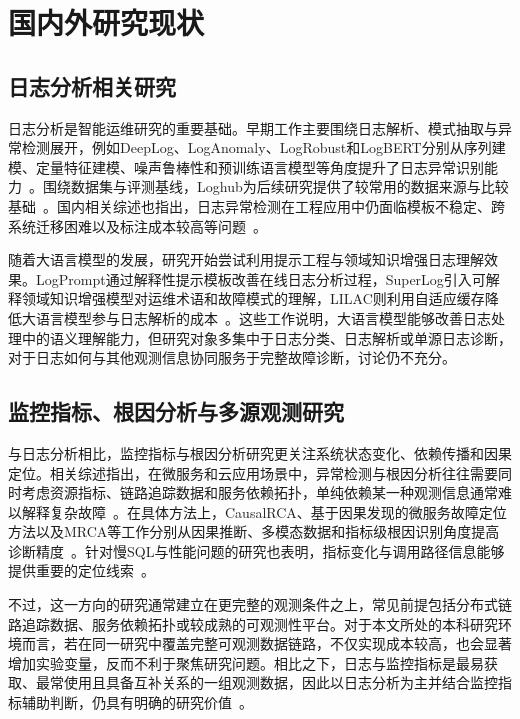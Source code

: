 \section{国内外研究现状}

\subsection{日志分析相关研究}

日志分析是智能运维研究的重要基础。早期工作主要围绕日志解析、模式抽取与异常检测展开，例如DeepLog、LogAnomaly、LogRobust和LogBERT分别从序列建模、定量特征建模、噪声鲁棒性和预训练语言模型等角度提升了日志异常识别能力~\cite{du2017deeplog,meng2019loganomaly,zhang2019logrobust,guo2021logbert}。围绕数据集与评测基线，Loghub为后续研究提供了较常用的数据来源与比较基础~\cite{he2020loghub,zhu2023loghub}。国内相关综述也指出，日志异常检测在工程应用中仍面临模板不稳定、跨系统迁移困难以及标注成本较高等问题~\cite{jia2020logsurvey,yan2022logsurveyml}。

随着大语言模型的发展，研究开始尝试利用提示工程与领域知识增强日志理解效果。LogPrompt通过解释性提示模板改善在线日志分析过程，SuperLog引入可解释领域知识增强模型对运维术语和故障模式的理解，LILAC则利用自适应缓存降低大语言模型参与日志解析的成本~\cite{liu2024logprompt,ji2025superlog,jiang2024lilac}。这些工作说明，大语言模型能够改善日志处理中的语义理解能力，但研究对象多集中于日志分类、日志解析或单源日志诊断，对于日志如何与其他观测信息协同服务于完整故障诊断，讨论仍不充分。

\subsection{监控指标、根因分析与多源观测研究}

与日志分析相比，监控指标与根因分析研究更关注系统状态变化、依赖传播和因果定位。相关综述指出，在微服务和云应用场景中，异常检测与根因分析往往需要同时考虑资源指标、链路追踪数据和服务依赖拓扑，单纯依赖某一种观测信息通常难以解释复杂故障~\cite{soldani2023survey,cheng2023rcasurvey,zhang2024fdsurvey}。在具体方法上，CausalRCA、基于因果发现的微服务故障定位方法以及MRCA等工作分别从因果推断、多模态数据和指标级根因识别角度提高诊断精度~\cite{xin2023causalrca,ikram2022causaldiscovery,wang2024mrca}。针对慢SQL与性能问题的研究也表明，指标变化与调用路径信息能够提供重要的定位线索~\cite{ma2020slowquery,pham2024rcacausal}。

不过，这一方向的研究通常建立在更完整的观测条件之上，常见前提包括分布式链路追踪数据、服务依赖拓扑或较成熟的可观测性平台。对于本文所处的本科研究环境而言，若在同一研究中覆盖完整可观测数据链路，不仅实现成本较高，也会显著增加实验变量，反而不利于聚焦研究问题。相比之下，日志与监控指标是最易获取、最常使用且具备互补关系的一组观测数据，因此以日志分析为主并结合监控指标辅助判断，仍具有明确的研究价值~\cite{pham2024rcacausal,zhang2024fdsurvey}。

